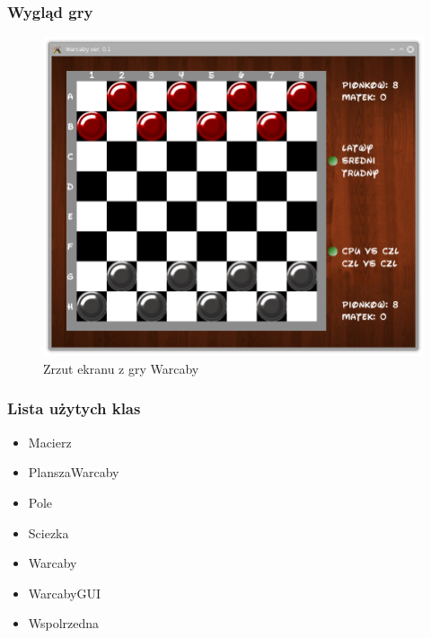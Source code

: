 \documentclass{beamer}
\begin{document}
  \begin{frame}
  	\frametitle{Wygląd gry}
  	\begin{figure}
      \centering
      \includegraphics[width=0.7\linewidth]{./img/warcaby}
	  \caption{Zrzut ekranu z gry Warcaby}
	  \label{fig:warcaby}
	\end{figure}
  \end{frame}
  
   \begin{frame}
    	\frametitle{Lista użytych klas}
    	\begin{itemize}
    	   \item Macierz	
    	   \item PlanszaWarcaby
    	   \item Pole	
    	   \item Sciezka
    	   \item Warcaby
    	   \item WarcabyGUI	
    	   \item Wspolrzedna
    	\end{itemize}
    \end{frame}  
 
\end{document}
